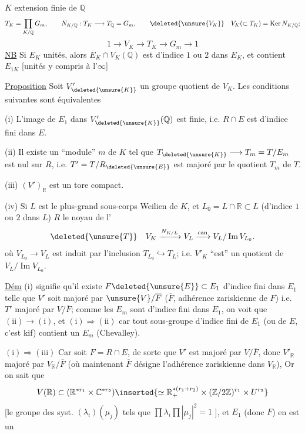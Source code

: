 $K$ extension finie de $\mathbb Q$
\[
T_K=\prod_{K/\mathbb Q}G_m,\qquad
N_{K/\mathbb Q}:T_K\longrightarrow T_{\mathbb Q}=G_m,\qquad
\deleted{\unsure{V_K}}\quad V_K(\subset T_K)=\operatorname{Ker}N_{K/\mathbb Q};
\]
\[
1\longrightarrow V_K\longrightarrow T_K\longrightarrow G_m\longrightarrow1
\]
\uline{NB} Si $E_K$ unités, alors $E_K\cap V_K(\mathbb Q)$ est d'indice $1$ ou $2$
dans $E_K$, et contient $E_{1K}$ [unités  y compris à l'$\infty$]

\uline{Proposition} Soit $V'_{\deleted{\unsure{K}}}$  un groupe quotient de $V_K$.
Les conditions suivantes sont équivalentes

(i) L'image de $E_1$ dans $V'_{\deleted{\unsure{K}}}(\mathbb Q)$ est finie, i.e.
$R\cap E$ est d'indice fini dans $E$.

(ii) Il existe un ``module'' $m$ de $K$ tel que
$T_{\deleted{\unsure{K}}}\longrightarrow T_m=T/E_m$
est nul sur $R$, i.e. $T'=T/R_{\deleted{\unsure{E}}}$ est majoré par le quotient $T_m$ de $T$.

(iii) $(V')_{\mathbb R}$ est un tore compact.

(iv) Si $L$  est le plus-grand sous-corps Weilien de $K$, et
$L_0=L\cap\mathbb R\subset L$ (d'indice $1$ ou $2$ dans $L$)
$R$   le noyau de l'
\[
\deleted{\unsure{T}}\quad
V_K\xrightarrow{N_{K/L}}V_L\xrightarrow{\mathrm{can}}V_L/\operatorname{Im}V_{L_0}.
\]
où $V_{L_0}\longrightarrow V_L$ est induit par l'inclusion
$T_{L_0}\hookrightarrow T_L$; i.e.
$V'_K$ ``est'' un quotient de $V_L/\operatorname{Im}V_{L_0}$.

\uline{Dém} (i) signifie qu'il existe $F\deleted{\unsure{E}}\subset E_1$
 d'indice fini dans $E_1$ telle que $V'$ soit majoré par
$\unsure{V}/\overline F$ ($\overline F$, adhérence zariskienne de $F$)
i.e. $T'$ majoré par $V/\overline F$; comme les $E_m$ sont d'indice fini
dans $E_1$, on voit que $(\mathrm{ii})\longrightarrow(\mathrm{i})$, et
$(\mathrm{i})\Rightarrow(\mathrm{ii})$ car tout sous-groupe d'indice fini de $E_1$
 (ou de $E$, c'est kif) contient un $E_m$ (Chevalley).

$(\mathrm{i})\Longrightarrow(\mathrm{iii})$ Car soit 
$F=R\cap E$, de sorte que $V'$ est majoré par $V/\overline F$,
 donc $V'_{\mathbb R}$ majoré par $V_{\mathbb R}/\overline F$
(où maintenant $\overline F$ désigne l'adhérence zariskienne dans $V_{\mathbb R}$),
Or on sait que
\[
V(\mathbb R)\subset
(\mathbb R^{*r_1}\times\mathbb C^{*r_2})
\inserted{\simeq\mathbb R_+^{*(r_1+r_2)}\times(\mathbb Z/2\mathbb Z)^{r_1}\times U^{r_2}}
\]
[le   groupe des syst. $(\lambda_i)(\mu_j)$
tels que $\prod\lambda_i\prod|\mu_j|^2=1$
],
et $E_1$ (donc $F$) en est un
